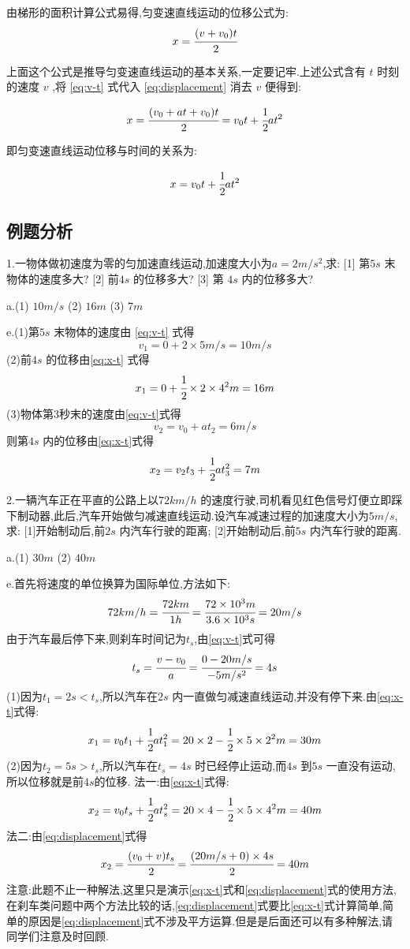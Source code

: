 由梯形的面积计算公式易得,匀变速直线运动的位移公式为:
\begin{equation}
x=\cfrac{(v+v_0)t}{2}
  \label{eq:displacement}
\end{equation}

上面这个公式是推导匀变速直线运动的基本关系,一定要记牢.上述公式含有 $t$ 时刻的速度 $v$ ,将 \eqref{eq:v-t} 式代入 \eqref{eq:displacement} 消去 $v$ 便得到:

\begin{equation*}
x=\cfrac{(v_0+at+v_0)t}{2}=v_0t+\cfrac{1}{2}at^2
\end{equation*}

即匀变速直线运动位移与时间的关系为:

\begin{equation}
x=v_0t+\cfrac{1}{2}at^2
  \label{eq:x-t}
\end{equation}

\subsection{例题分析}
\begin{calculate}
  1.一物体做初速度为零的匀加速直线运动,加速度大小为$a=2m/s^2$,求:
  [1] 第$5s$ 末物体的速度多大?
  [2] 前$4s$ 的位移多大?
  [3] 第 $4s$ 内的位移多大?

  a.(1) $10m/s$ (2) $16m$ (3) $7m$

  e.(1)第$5s$ 末物体的速度由 \eqref{eq:v-t} 式得
  $$v_1=0+2\times 5m/s=10m/s$$
  (2)前$4s$ 的位移由\eqref{eq:x-t} 式得
  $$x_1=0+\cfrac{1}{2}\times 2\times 4^2m=16m$$
  (3)物体第3秒末的速度由\eqref{eq:v-t}式得
  $$v_2=v_0+at_2=6m/s$$
  则第$4s$ 内的位移由\eqref{eq:x-t}式得
  $$x_2=v_2t_3+\cfrac{1}{2}at_3^2=7m$$

  2.一辆汽车正在平直的公路上以$72km/h$ 的速度行驶,司机看见红色信号灯便立即踩下制动器,此后,汽车开始做匀减速直线运动.设汽车减速过程的加速度大小为$5m/s$,求:
  [1]开始制动后,前$2s$ 内汽车行驶的距离;
  [2]开始制动后,前$5s$ 内汽车行驶的距离.

  a.(1) $30m$ (2) $40m$

  e.首先将速度的单位换算为国际单位,方法如下:
  $$72km/h=\cfrac{72km}{1h}=\cfrac{72\times 10^3m}{3.6\times 10^3 s}=20m/s$$
  由于汽车最后停下来,则刹车时间记为$t_s$,由\eqref{eq:v-t}式可得
  $$t_s=\cfrac{v-v_0}{a}=\cfrac{0-20m/s}{-5m/s^2}=4s$$
  (1)因为$t_1=2s <t_s$,所以汽车在$2s$ 内一直做匀减速直线运动,并没有停下来.由\eqref{eq:x-t}式得:
  $$x_1=v_0t_1+\cfrac{1}{2}at_1^2=20\times2-\cfrac{1}{2}\times5\times2^2 m=30m$$
  (2)因为$t_2=5s>t_s$,所以汽车在$t_s=4s$ 时已经停止运动,而$4s$ 到$5s$ 一直没有运动,所以位移就是前$4s$的位移.
  \newline
  法一:由\eqref{eq:x-t}式得:
  $$x_2=v_0t_s+\cfrac{1}{2}at_s^2=20\times4-\cfrac{1}{2}\times5\times4^2m=40m$$
  法二:由\eqref{eq:displacement}式得
  $$x_2=\cfrac{(v_0+v)t_s}{2}=\cfrac{(20m/s+0)\times 4s}{2}=40m$$
  注意:此题不止一种解法,这里只是演示\eqref{eq:x-t}式和\eqref{eq:displacement}式的使用方法,在刹车类问题中两个方法比较的话,\eqref{eq:displacement}式要比\eqref{eq:x-t}式计算简单,简单的原因是\eqref{eq:displacement}式不涉及平方运算.但是是后面还可以有多种解法,请同学们注意及时回顾.

\end{calculate}
